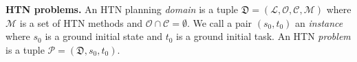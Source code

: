 \documentclass[letterpaper]{article} %
\newcommand{\Operators}{\mathcal{O}}
\newcommand{\Cactions}{\mathcal{C}}
\newcommand{\HtnDomain}{\mathfrak{D}}
\newcommand{\Methods}{\mathcal{M}}
\newcommand{\Lvar}{\mathcal{L}}
\newcommand{\M}{\mathcal{M}}
\renewcommand{\P}{\mathcal{P}}
\newcommand{\tn}{\mathsf{tn}}
\begin{document}
\smallskip
\noindent\textbf{HTN problems.}
An HTN planning \emph{domain} is a tuple $\HtnDomain=(\Lvar,\Operators,\Cactions,\Methods)$ where $\Methods$ is a set of HTN methods and $\Operators \cap \Cactions =\emptyset$.
We call a pair $(s_0,t_0)$ an \emph{instance} where $s_0$ is a ground initial state and $t_0$ is a ground initial task.
An HTN \emph{problem} is a tuple $\P= (\HtnDomain,s_0,t_0)$. %



\end{document}
